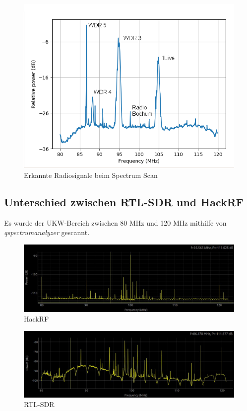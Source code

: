 \documentclass[12pt,a4paper]{article}
\begin{document}
\begin{figure}[hbt!]
	\centering
		\includegraphics[width=1\textwidth ]
		{Bilder/a3_ukw.png}
		\caption{Erkannte Radiosignale beim Spectrum Scan}
\end{figure}
\clearpage

\subsection*{Unterschied zwischen RTL-SDR und HackRF}

Es wurde der UKW-Bereich zwischen 80 MHz und 120 MHz mithilfe 
von \textit{qspectrumanalyzer} gescannt.

\begin{figure}[hbt!]
	\centering
		\includegraphics[width=1\textwidth ]
		{Bilder/a3_hackrf.jpg}
		\caption{HackRF}
		\label{fig:Label3}
\end{figure}

\begin{figure}[hbt!]
	\centering
		\includegraphics[width=1\textwidth ]
		{Bilder/a3_rtl_sdr.jpg}
		\caption{RTL-SDR}
		\label{fig:Label4}
\end{figure}
\end{document}
